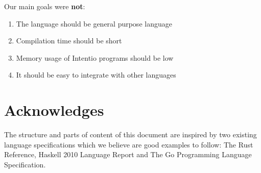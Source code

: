 Our main goals were \textbf{not}:
\begin{enumerate}
  \item The language should be general purpose language
  \item Compilation time should be short
  \item Memory usage of Intentio programs should be low
  \item It should be easy to integrate with other languages
\end{enumerate}

\section*{Acknowledges}

The structure and parts of content of this document are inspired by two existing language specifications which we believe are good examples to follow: The Rust Reference\cite{TheRustReference}, Haskell 2010 Language Report\cite{Marlow_haskell2010} and The Go Programming Language Specification\cite{TheGoProgrammingLanguage}.
